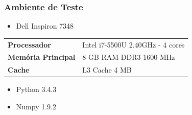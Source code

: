 \documentclass[10pt]{beamer}
\begin{document}
\begin{frame}[fragile]
  \frametitle{Ambiente de Teste}

 \begin{itemize}
      \item Dell Inspiron 7348
    \end{itemize}

    \begin{table}[!htb]
    \footnotesize
    \centering
    \begin{tabular}{ll}
      \toprule
      \textbf{Processador} & Intel i7-5500U 2.40GHz - 4 cores  \\
      \textbf{Memória Principal} & 8 GB RAM DDR3 1600 MHz \\
      \textbf{Cache} & L3 Cache 4 MB \\
      \bottomrule
    \end{tabular}
    \end{table}

  \begin{itemize}
    \item Python 3.4.3
    \item Numpy 1.9.2
  \end{itemize}
  
\end{frame}
\end{document}
